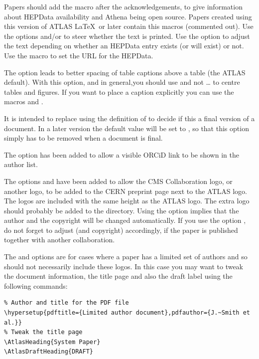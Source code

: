  Papers should add the macro  after the acknowledgements,
to give information about HEPData availability and Athena being open source.
Papers created using this version of ATLAS \LaTeX\ or later contain this macros (commented out).
Use the options  and/or  to steer whether the text is printed.
Use the option  to adjust the text depending on whether an HEPData entry exists (or will exist) or not.
Use the macro  to set the URL for the HEPData.

 The option  leads to better spacing of table captions above a table (the ATLAS default).
With this option, and in general,you should use 
and not \ldots{} to centre tables and figures.
If you want to place a caption explicitly you can use
the macros  and .

 It is intended to replace using the definition of  to decide if this a final version of a document.
In a later version the default value will be set to ,
so that this option simply has to be removed when a document is final.

 The option  has been added to allow
a visible ORCiD link to be shown in the author list.

 The options  and  have been added to allow
the CMS Collaboration logo, or another logo, to be added to the CERN preprint page next to the ATLAS logo.
The logos are included with the same height as the ATLAS logo.
The extra logo should probably be added to the  directory.
Using the option  implies that the author and the copyright will be changed automatically.
If you use the option , do not forget to adjust  (and copyright) accordingly,
if the paper is published together with another collaboration.

The  and  options are for cases where a paper has a limited set of authors
and so should not necessarily include these logos.
In this case you may want to tweak the  document information,
the title page and also the draft label using the following commands:
\begin{verbatim}
% Author and title for the PDF file
\hypersetup{pdftitle={Limited author document},pdfauthor={J.~Smith et al.}}
% Tweak the title page
\AtlasHeading{System Paper}
\AtlasDraftHeading{DRAFT}
\end{verbatim}


